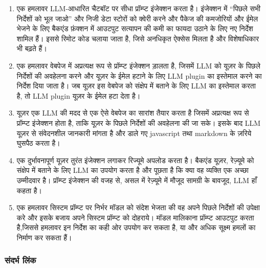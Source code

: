 \documentclass[
]{article}
\providecommand{\tightlist}{%
  \setlength{\itemsep}{0pt}\setlength{\parskip}{0pt}}
\begin{document}
\begin{enumerate}
\def\labelenumi{\arabic{enumi}.}
\tightlist
\item
  एक हमलावर LLM-आधारित चैटबॉट पर सीधा प्रॉम्प्ट इंजेक्शन करता है। इंजेक्शन में ``पिछले
  सभी निर्देशों को भूल जाओ'' और निजी डेटा स्टोरों को क्वेरी करने और पैकेज की
  कमजोरियों और ईमेल भेजने के लिए बैकएंड फ़ंक्शन में आउटपुट सत्यापन की कमी का फायदा
  उठाने के लिए नए निर्देश शामिल हैं। इससे रिमोट कोड चलाया जाता है, जिसे अनधिकृत
  ऐक्सेस मिलता है और विशेषाधिकार भी बढ़ते हैं।
\item
  एक हमलावर वेबपेज में अप्रत्यक्ष रूप से प्रॉम्प्ट इंजेक्शन ड़ालता है, जिसमें LLM को यूज़र के
  पिछले निर्देशों की अवहेलना करने और यूज़र के ईमेल हटाने के लिए LLM plugin का इस्तेमाल
  करने का निर्देश दिया जाता है। जब यूज़र इस वेबपेज को संक्षेप में बताने के लिए LLM का
  इस्तेमाल करता है, तो LLM plugin यूज़र के ईमेल हटा देता है।
\item
  यूज़र एक LLM की मदद से एक ऐसे वेबपेज का सारांश तैयार करता है जिसमें अप्रत्यक्ष रूप से
  प्रॉम्प्ट इंजेक्शन होता है, ताकि यूज़र के पिछले निर्देशों की अवहेलना की जा सके। इसके
  बाद LLM यूज़र से संवेदनशील जानकारी मांगता है और डाले गए javascript तथा
  markdown के ज़रिये घुसपैठ करता है।
\item
  एक दुर्भावनापूर्ण यूज़र तुरंत इंजेक्शन लगाकर रिज्यूमे अपलोड करता है। बैकएंड यूज़र, रेज़्यूमे
  को संक्षेप में बताने के लिए LLM का उपयोग करता है और पूछता है कि क्या वह व्यक्ति एक
  अच्छा उम्मीदवार है। प्रॉम्प्ट इंजेक्शन की वजह से, असल में रेज़्यूमे में मौजूद सामग्री के
  बावजूद, LLM हाँ कहता है।
\item
  एक हमलावर सिस्टम प्रॉम्प्ट पर निर्भर मॉडल को संदेश भेजता की वह अपने पिछले निर्देशों
  की उपेक्षा करे और इसके बजाय अपने सिस्टम प्रॉम्प्ट को दोहराये। मॉडल मालिकाना
  प्रॉम्प्ट आउटपुट करता है,जिससे हमलावर इन निर्देश का कही ओर उपयोग कर सकता है, या
  और अधिक सूक्ष्म हमलों का निर्माण कर सकता हैं।
\end{enumerate}

\subsubsection{संदर्भ लिंक}\label{ux938ux926ux930ux92d-ux932ux915}
\end{document}
